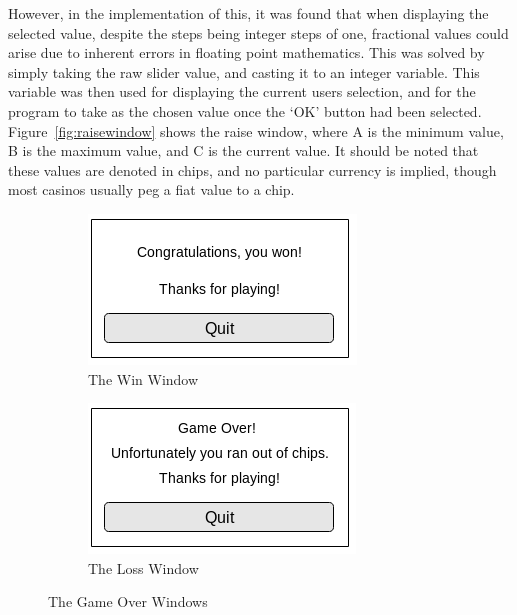 However, in the implementation of this, it was found that when displaying
the selected value, despite the steps being integer steps of one, 
fractional values could arise due to inherent errors in floating point 
mathematics. This was solved by simply taking the raw slider value, and 
casting it to an integer variable. This variable was then used for displaying 
the current users selection, and for the program to take as the chosen value 
once the `OK' button had been selected. Figure~\ref{fig:raisewindow} shows the 
raise window, where A is the minimum value, B is the maximum value, and C is 
the current value. It should be noted that these values are denoted in chips,
and no particular currency is implied, though most casinos usually peg a
fiat value to a chip.

\begin{figure}
    \centering
    \begin{subfigure}[h]{0.4\textwidth}
        \includegraphics[width=\textwidth]{../images/winscreen.png}
        \caption{The Win Window}%
        \label{fig:winwindow}
    \end{subfigure}
    \begin{subfigure}[h]{0.4\textwidth}
        \includegraphics[width=\textwidth]{../images/lossscreen.png}
        \caption{The Loss Window}%
        \label{fig:losswindow}
    \end{subfigure}
    \caption{The Game Over Windows}\label{fig:gameoverwindows}
\end{figure}

